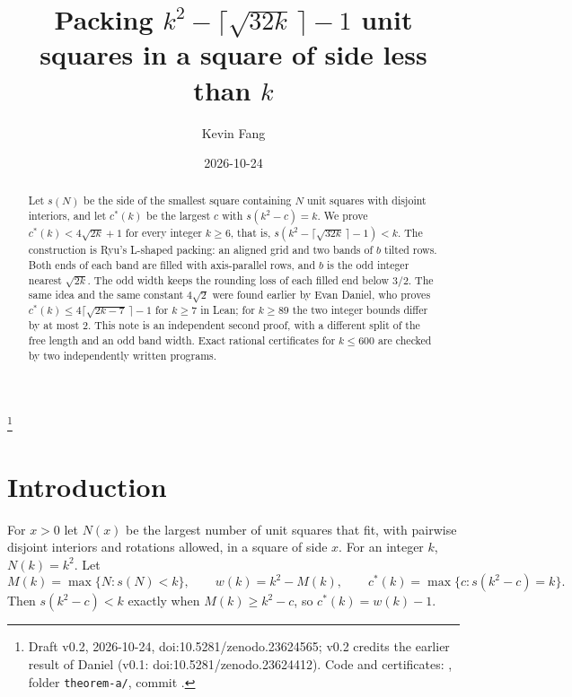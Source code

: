 \documentclass[11pt,letterpaper]{amsart}
\theoremstyle{plain}
\theoremstyle{remark}
\newcommand{\cs}{c^{*}}
\begin{document}
\title[Packing $k^2-\lceil\sqrt{32k}\,\rceil-1$ unit squares below side $k$]{Packing $k^2-\lceil\sqrt{32k}\,\rceil-1$ unit squares in a square of side less than $k$}
\author{Kevin Fang}
\date{2026-10-24}
\thanks{Draft v0.2, 2026-10-24, doi:10.5281/zenodo.23624565; v0.2 credits the earlier result of Daniel \cite{Dan26b} (v0.1: doi:10.5281/zenodo.23624412). Code and certificates: \cite{Fan26b}, folder \texttt{theorem-a/}, commit .}

\begin{abstract}
Let $s(N)$ be the side of the smallest square containing $N$ unit squares with disjoint interiors, and let $\cs(k)$ be the largest $c$ with $s(k^2-c)=k$. We prove $\cs(k)<4\sqrt{2k}+1$ for every integer $k\ge6$, that is, $s(k^2-\lceil\sqrt{32k}\,\rceil-1)<k$. The construction is Ryu's L-shaped packing: an aligned grid and two bands of $b$ tilted rows. Both ends of each band are filled with axis-parallel rows, and $b$ is the odd integer nearest $\sqrt{2k}$. The odd width keeps the rounding loss of each filled end below $3/2$. The same idea and the same constant $4\sqrt2$ were found earlier by Evan Daniel, who proves $\cs(k)\le4\lceil\sqrt{2k-7}\,\rceil-1$ for $k\ge7$ in Lean; for $k\ge89$ the two integer bounds differ by at most $2$. This note is an independent second proof, with a different split of the free length and an odd band width. Exact rational certificates for $k\le600$ are checked by two independently written programs.
\end{abstract}

\maketitle

\section{Introduction}

For $x>0$ let $N(x)$ be the largest number of unit squares that fit, with pairwise disjoint interiors and rotations allowed, in a square of side $x$. For an integer $k$, $N(k)=k^2$. Let
\[
M(k)=\max\{N : s(N)<k\},\qquad w(k)=k^2-M(k),\qquad \cs(k)=\max\{c : s(k^2-c)=k\}.
\]
Then $s(k^2-c)<k$ exactly when $M(k)\ge k^2-c$, so $\cs(k)=w(k)-1$.
\end{document}
